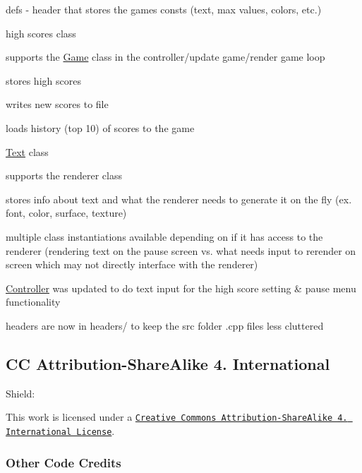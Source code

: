 \begin{DoxyItemize}
\item defs -\/ header that stores the games consts (text, max values, colors, etc.)
\item high scores class
\begin{DoxyItemize}
\item supports the \hyperlink{classGame}{Game} class in the controller/update game/render game loop
\item stores high scores
\item writes new scores to file
\item loads history (top 10) of scores to the game
\end{DoxyItemize}
\item \hyperlink{classText}{Text} class
\begin{DoxyItemize}
\item supports the renderer class
\item stores info about text and what the renderer needs to generate it on the fly (ex. font, color, surface, texture)
\item multiple class instantiations available depending on if it has access to the renderer (rendering text on the pause screen vs. what needs input to rerender on screen which may not directly interface with the renderer)
\end{DoxyItemize}
\item \hyperlink{classController}{Controller} was updated to do text input for the high score setting \& pause menu functionality
\item headers are now in headers/ to keep the src folder .cpp files less cluttered
\end{DoxyItemize}

\subsection*{CC Attribution-\/\+Share\+Alike 4. International}

Shield\+: \href{http://creativecommons.org/licenses/by-sa/4.0/}{\tt }

This work is licensed under a \href{http://creativecommons.org/licenses/by-sa/4.0/}{\tt Creative Commons Attribution-\/\+Share\+Alike 4. International License}.

\href{http://creativecommons.org/licenses/by-sa/4.0/}{\tt }

\subsubsection*{Other Code Credits}

